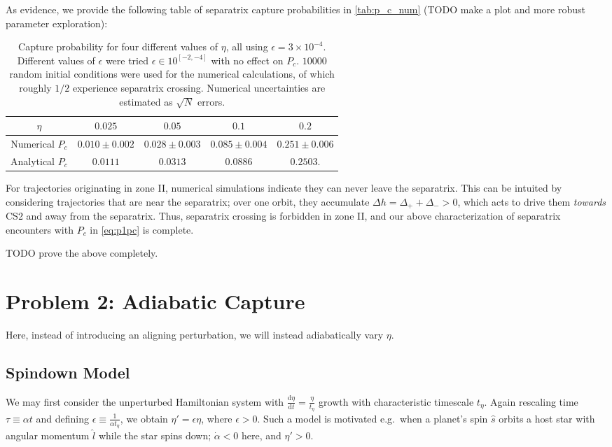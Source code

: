 \documentclass[
        fleqn,
        usenatbib,
    ]{mnras}
\newcommand*{\rd}[2]{\frac{\mathrm{d}#1}{\mathrm{d}#2}}
\begin{document}
As evidence, we provide the following table of separatrix capture probabilities
in \autoref{tab:p_c_num} (TODO make a plot and more robust parameter
exploration):
\begin{table*}
    \centering
    \begin{tabular}{c|c c c c}
        $\eta$ & $0.025$ & $0.05$ & $0.1$ & $0.2$\\\midrule
        Numerical $P_c$ & $0.010 \pm 0.002$ & $0.028 \pm 0.003$
            & $0.085 \pm 0.004$ & $0.251 \pm 0.006$ \\
        Analytical $P_c$ & $0.0111$ & $0.0313$ & $0.0886$ & $0.2503$.
    \end{tabular}
    \caption{Capture probability for four different values of $\eta$, all using
    $\epsilon = 3 \times 10^{-4}$. Different values of $\epsilon$ were tried
    $\epsilon \in 10^{[-2, -4]}$ with no effect on $P_c$. $10000$ random initial
    conditions were used for the numerical calculations, of which roughly $1/2$
    experience separatrix crossing. Numerical uncertainties are estimated as
    $\sqrt{N}$ errors.}\label{tab:p_c_num}
\end{table*}

For trajectories originating in zone II, numerical simulations indicate they can
never leave the separatrix. This can be intuited by considering trajectories
that are near the separatrix; over one orbit, they accumulate $\Delta h =
\Delta_+ + \Delta_- > 0$, which acts to drive them \emph{towards} CS2 and away
from the separatrix. Thus, separatrix crossing is forbidden in zone II, and our
above characterization of separatrix encounters with $P_c$ in \autoref{eq:p1pc}
is complete.

TODO prove the above completely.

\section{Problem 2: Adiabatic Capture}\label{s:p2}

Here, instead of introducing an aligning perturbation, we will instead
adiabatically vary $\eta$.

\subsection{Spindown Model}

We may first consider the unperturbed Hamiltonian
system with $\rd{\eta}{t} = \frac{\eta}{t_\eta}$ growth with characteristic
timescale $t_\eta$. Again rescaling time $\tau \equiv \alpha t$ and defining
$\epsilon \equiv \frac{1}{\alpha t_\eta}$, we obtain $\eta' = \epsilon
\eta$, where $\epsilon > 0$. Such a model is motivated e.g.\ when a planet's
spin $\hat{s}$ orbits a host star with angular momentum $\hat{l}$ while the star
spins down; $\dot{\alpha} < 0$ here, and $\eta' > 0$.
\end{document}
